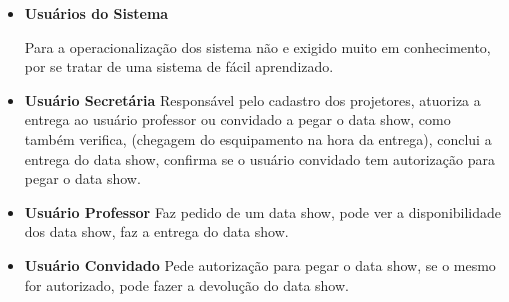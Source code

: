 \begin{flushleft}


  \begin{itemize}
    
    \item \textbf{Usuários do Sistema}

      Para a operacionalização dos sistema não e exigido muito em conhecimento, por
      se tratar de uma sistema de fácil aprendizado. 

    \item \textbf{Usuário Secretária} Responsável pelo cadastro dos projetores,
      atuoriza a entrega ao usuário professor ou convidado a pegar o data show,
      como também verifica, (chegagem do esquipamento na hora da entrega),
      conclui a entrega do data show, confirma se o usuário convidado tem
      autorização para pegar o data show.

    \item \textbf{Usuário Professor} Faz pedido de um data show, pode ver a
      disponibilidade dos data show, faz a entrega do data show. 

    \item \textbf{Usuário Convidado} Pede autorização para pegar o data show, se o
      mesmo for autorizado, pode fazer a devolução do data show.

  \end{itemize}

\end{flushleft}
